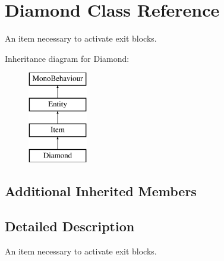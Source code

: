 \hypertarget{class_diamond}{}\section{Diamond Class Reference}
\label{class_diamond}


An item necessary to activate exit blocks.  


Inheritance diagram for Diamond\+:\begin{figure}[H]
\begin{center}
\leavevmode
\includegraphics[height=4.000000cm]{class_diamond}
\end{center}
\end{figure}
\subsection*{Additional Inherited Members}


\subsection{Detailed Description}
An item necessary to activate exit blocks. 

